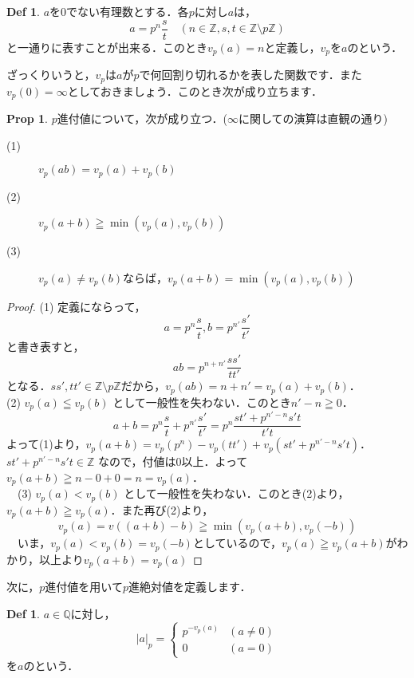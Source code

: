 \documentclass[./main]{subfiles}
\theoremstyle{definition}
\newtheorem{defi}[theo]{Def}
\newtheorem{prop}[theo]{Prop}
\newcommand{\Z}{\mathbb{Z}}%
\newcommand{\Q}{\mathbb{Q}}%
\newcommand{\abs}[1]{\left\lvert#1\right\rvert}%
\begin{document}
\begin{defi}
$a$を0でない有理数とする．各$p$に対し$a$は，
\[
a=p^n \frac{s}{t} \quad (n\in \Z, s,t \in \Z \setminus p\Z )
\]
と一通りに表すことが出来る．このとき$v_p(a)=n$と定義し，$v_p$を$a$のという．
\end{defi}

ざっくりいうと，$v_p$は$a$が$p$で何回割り切れるかを表した関数です．また$v_p(0)=\infty$としておきましょう．このとき次が成り立ちます．

\begin{prop}
$p$進付値について，次が成り立つ．($\infty$に関しての演算は直観の通り)
\begin{description}
	\item[(1)] $v_p(ab)=v_p(a)+v_p(b)$
	\item[(2)] $v_p(a+b) \geqq \min(v_p(a),v_p(b))$
	\item[(3)] $v_p(a) \neq v_p(b)$ならば，$v_p(a+b)=\min(v_p(a),v_p(b))$
\end{description}
\end{prop}

\begin{proof}
	(1) 定義にならって，
	\[
	a=p^n \frac{s}{t},b=p^{n'} \frac{s'}{t'}
	\]
	と書き表すと，
	\[
	ab=p^{n+n'}\frac{ss'}{tt'}
	\]
	となる．$ss',tt' \in \Z \setminus p\Z$だから，$v_p(ab)=n+n'=v_p(a)+v_p(b)$． \\
	(2) $v_p(a) \leqq v_p(b)$ として一般性を失わない．このとき$n'-n \geqq 0$．
　\[
　a+b=p^n \frac{s}{t} + p^{n'} \frac{s'}{t'} = p^n\frac{st'+p^{n'-n}s't}{t't}
　\]
	よって(1)より，$v_p(a+b) = v_p(p^n) - v_p(tt') + v_p(st'+p^{n'-n}s't)$．$st'+p^{n'-n}s't \in \Z$ なので，付値は0以上．よって$v_p(a+b) \geqq n-0+0 =n= v_p(a)$．\\
　(3) $v_p(a) < v_p(b)$ として一般性を失わない．このとき(2)より，$v_p(a+b) \geqq v_p(a)$．また再び(2)より，
　\[
　v_p(a)=v((a+b)-b) \geqq \min(v_p(a+b),v_p(-b))
　\]
　いま，$v_p(a) < v_p(b)=v_p(-b)$としているので，$v_p(a) \geqq v_p(a+b)$がわかり，以上より$v_p(a+b)=v_p(a)$
\end{proof}

次に，$p$進付値を用いて$p$進絶対値を定義します．

\begin{defi}
$a \in \Q$に対し，
\begin{equation*}
\abs{a}_p= \begin{cases}
	p^{-v_p(a)} &(a \neq 0)\\
	0 &(a=0)
	\end{cases}
\end{equation*}
を$a$のという．
\end{defi}
\end{document}
